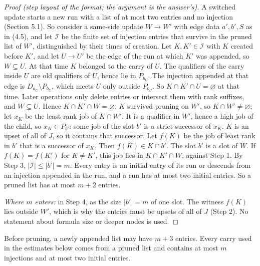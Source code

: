 \begin{proof}[Proof (step layout of the format; the argument is the answer's)]
A switched update starts a new run with a list of at most two entries and no injection (Section 5.1). So consider a
same-side update $W\to W'$ with edge data $a',b',S$ as in (4.5), and let $\mathscr I$ be the finite set of injection
entries that survive in the pruned list of $W'$, distinguished by their times of creation.
 Let $K,K'\in\mathscr I$ with $K$ created before $K'$, and
let $U\to U'$ be the edge of the run at which $K'$ was appended, so $W\subseteq U$. At that time $K$ belonged to the
carry of $U$. The qualifiers of the carry inside $U$ are old qualifiers of $U$, hence lie in $P_{b_U}$. The injection
appended at that edge is $D_{a_U}\setminus P_{b_U}$, which meets $U$ only outside $P_{b_U}$. So $K\cap K'\cap
U=\varnothing$ at that time. Later operations only delete entries or intersect them with rank suffixes, and
$W\subseteq U$. Hence $K\cap K'\cap W=\varnothing$. 
 $K$ survived pruning on $W'$, so $K\cap
W'\neq\varnothing$; let $x_K$ be the least-rank job of $K\cap W'$. It is a qualifier in $W'$, hence a high job of the child, so
$x_K\in P_{b'}$: some job of the slot $b'$ is a strict successor of $x_K$. $K$ is an upset of all of $J$, so it
contains that successor. Let $f(K)$ be the job of least rank in $b'$ that is a successor of $x_K$. Then $f(K)\in
K\cap b'$. 
 The slot $b'$ is a slot of $W$. If $f(K)=f(K')$ for $K\neq K'$, this
job lies in $K\cap K'\cap W$, against Step 1. 
 By Step 3, $|\mathscr I|\leq|b'|=m$. Every entry is an initial entry of its run or descends from
an injection appended in the run, and a run has at most two initial entries. So a pruned list has at most $m+2$
entries. 

\noindent\emph{Where $m$ enters:} in Step 4, as the size $|b'|=m$ of one slot. The witness $f(K)$ lies outside $W'$,
which is why the entries must be upsets of all of $J$ (Step 2). No statement about formula size or deeper nodes is
used.
\end{proof}

Before pruning, a newly appended list may have \(m+3\) entries. Every carry used in the estimates below comes from a pruned list and contains at most \(m\) injections and at most two initial entries.


